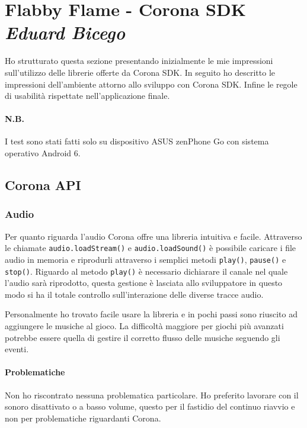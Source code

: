 \newpage
\section{Flabby Flame - Corona SDK\\ {\small \emph{Eduard Bicego}}}
\label{sec:corona}

	Ho strutturato questa sezione presentando inizialmente le mie impressioni sull'utilizzo delle librerie offerte da Corona SDK. In seguito ho descritto le impressioni dell'ambiente attorno allo sviluppo con Corona SDK. Infine le regole di usabilità rispettate nell'applicazione finale.
	\paragraph*{N.B.} I test sono stati fatti solo su dispositivo ASUS zenPhone Go con sistema operativo Android 6.
	
	\subsection{Corona API}

	\subsubsection{Audio}
		Per quanto riguarda l'audio Corona offre una libreria intuitiva e facile. Attraverso le chiamate \verb|audio.loadStream()| e \verb|audio.loadSound()| è possibile caricare i file audio in memoria e riprodurli attraverso i semplici metodi \verb|play()|, \verb|pause()| e \verb|stop()|. Riguardo al metodo \verb|play()| è necessario dichiarare il canale nel quale l'audio sarà riprodotto, questa gestione è lasciata allo sviluppatore in questo modo si ha il totale controllo sull'interazione delle diverse tracce audio.
		
		Personalmente ho trovato facile usare la libreria e in pochi passi sono riuscito ad aggiungere le musiche al gioco. La difficoltà maggiore per giochi più avanzati potrebbe essere quella di gestire il corretto flusso delle musiche seguendo gli eventi.
		
		
		\paragraph{Problematiche}
			Non ho riscontrato nessuna problematica particolare. Ho preferito lavorare con il sonoro disattivato o a basso volume, questo per il fastidio del continuo riavvio e non per problematiche riguardanti Corona.
	
